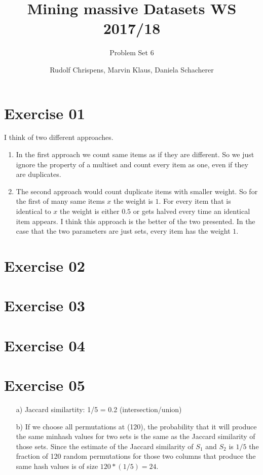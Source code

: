 \documentclass[11pt,a4paper]{scrartcl}
\title{Mining massive Datasets WS 2017/18}
\subtitle{Problem Set 6}
\author{Rudolf Chrispens, Marvin Klaus, Daniela Schacherer}
\begin{document}
\maketitle

\section*{Exercise 01}

I think of two different approaches.
\begin{enumerate}
\item In the first approach we count same items as if they are different. So we just ignore the property of a multiset and count every item as one, even if they are duplicates.
\item The second approach would count duplicate items with smaller weight. So for the first of many same items $x$ the weight is $1$. For every item that is identical to $x$ the weight is either $0.5$ or gets halved every time an identical item appears. I think this approach is the better of the two presented. In the case that the two parameters are just sets, every item has the weight $1$.
\end{enumerate}

\section*{Exercise 02}

\section*{Exercise 03}

\section*{Exercise 04}

\section*{Exercise 05}
\begin{itemize}
\item [a)] Jaccard similartity: 1/5 = 0.2 (intersection/union)
\item [b)] 
If we choose all permutations at (120), the probability that it will produce the same minhash values for two sets is the same as the Jaccard similarity of those sets. Since the estimate of the Jaccard similarity of $S_1$ and $S_2$ is $1/5$ the fraction of 120 random permutations for those two columns that produce the same hash values is of size $120 * (1/5) = 24$.
\end{itemize}
\end{document}

